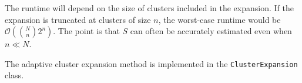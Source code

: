 \documentclass{jors}
\begin{document}
The runtime will depend on the size of clusters included in the expansion.
If the expansion is truncated at clusters of size $n$, the worst-case runtime
would be $\mathcal{O}\left(\binom{N}{n} 2^n\right)$.  The point is that $S$ can often
be accurately estimated even when $n \ll N$.

The adaptive cluster expansion method is implemented in the {\tt ClusterExpansion} class.


%
\end{document}
